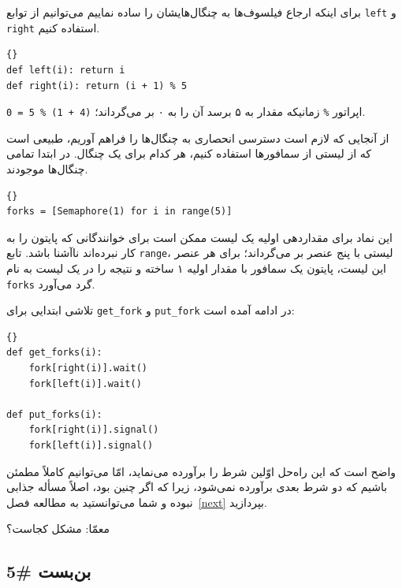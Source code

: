 \documentclass{book}
\newcommand{\clearemptydoublepage}{\newpage\cleardoublepage}
\begin{document}
    برای اینکه ارجاع فیلسوف‌ها به چنگال‌هایشان را ساده نماییم می‌توانیم از توابع {\tt left} و {\tt right} استفاده کنیم. 

\begin{latin}
\begin{lstlisting}[title=\rl{کدام چنگال؟}]{}
def left(i): return i
def right(i): return (i + 1) % 5
\end{lstlisting}
\end{latin}

    اپراتور {\tt \%} زمانیکه مقدار به ۵ برسد آن را به ۰ بر می‌گرداند؛ {\tt (4 + 1) \% 5 = 0}.

    از آنجایی که لازم است دسترسی انحصاری به چنگال‌ها را فراهم آوریم، طبیعی است که از لیستی از سمافورها استفاده کنیم، هر کدام برای یک چنگال. 
    در ابتدا تمامی چنگال‌ها موجودند. 

\begin{latin}
\begin{lstlisting}[title=\rl{متغیرهای غذا خوردن فیلسوف‌ها}]{}
forks = [Semaphore(1) for i in range(5)]
\end{lstlisting}
\end{latin}

    این نماد برای مقداردهی اولیه یک لیست ممکن است برای خوانندگانی که  پایتون را به کار نبرده‌اند ناآشنا باشد. 
    تابع {\tt range}، لیستی با پنج عنصر بر‌ می‌گرداند؛ برای هر عنصر این لیست، پایتون یک سمافور با مقدار اولیه ۱ ساخته 
    و نتیجه را در یک لیست به نام  {\tt forks} گرد می‌آورد.  

    تلاشی ابتدایی برای  {\tt get\_fork} و {\tt put\_fork} در ادامه آمده است:

\begin{latin}
\begin{lstlisting}[title=\rl{ناراه‌حل غذا خوردن فیلسوف‌ها}]{}
def get_forks(i):
    fork[right(i)].wait()
    fork[left(i)].wait()

def put_forks(i):
    fork[right(i)].signal()
    fork[left(i)].signal()
\end{lstlisting}
\end{latin}

    واضح است که این راه‌حل اوّلین شرط را برآورده می‌نماید، امّا می‌توانیم کاملاً مطمئن باشیم که دو شرط  بعدی برآورده نمی‌شود، زیرا که 
    اگر چنین بود، اصلاً مسأله جذابی نبوده و شما می‌توانستید به مطالعه فصل~\ref{next} بپردازید. 

    معمّا:‌ مشکل کجاست؟


\clearemptydoublepage
\subsection{بن‌بست \#5}
\end{document}
